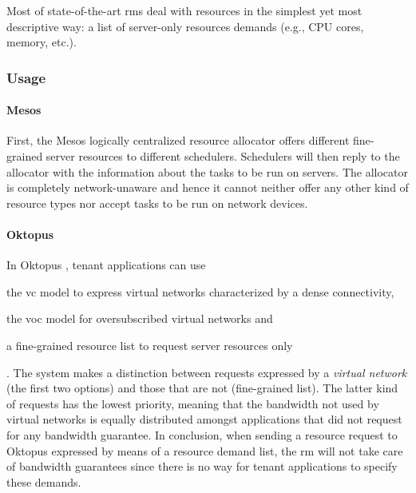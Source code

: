 Most of state-of-the-art \glspl{rm} \cite{mesos, borg, omega, kubernetes, yarn} deal with resources in the simplest yet most descriptive way: a list of server-only resources demands (e.g., CPU cores, memory, etc.).

\subsubsection{Usage}
\paragraph{Mesos \texorpdfstring{\cite{mesos}}{}}
First, the Mesos \cite{mesos} logically centralized resource allocator offers different fine-grained server resources to different schedulers.
Schedulers will then reply to the allocator with the information about the tasks to be run on servers.
The allocator is completely network-unaware and hence it cannot neither offer any other kind of resource types nor accept tasks to be run on network devices.

\paragraph{Oktopus \texorpdfstring{\cite{oktopus}}{}}
In Oktopus \cite{oktopus}, tenant applications can use
\begin{mylist}
    \item the \gls{vc} model to express virtual networks characterized by a dense connectivity,
    \item the \gls{voc} model for oversubscribed virtual networks and
    \item a fine-grained resource list to request server resources only
\end{mylist}.
The system makes a distinction between requests expressed by a \textit{virtual network} (the first two options) and those that are not (fine-grained list).
The latter kind of requests has the lowest priority, meaning that the bandwidth not used by virtual networks is equally distributed amongst applications that did not request for any bandwidth guarantee.
In conclusion, when sending a resource request to Oktopus \cite{oktopus} expressed by means of a resource demand list, the \gls{rm} will not take care of bandwidth guarantees since there is no way for tenant applications to specify these demands.

